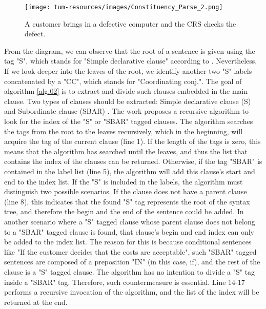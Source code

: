 \begin{figure}[h]
    \centering
    \caption{A customer brings in a defective computer and the CRS checks the defect.}
    \label{sec:implementation:constituency_parser}
    \texttt{[image: tum-resources/images/Constituency\_Parse\_2.png]}
\end{figure}

From the diagram, we can observe that the root of a sentence is given using the tag "S", which stands for "Simple declarative clause" according to \cite{penn_tree}. Nevertheless, If we look deeper into the leaves of the root, we identify another two "S" labels concatenated by a "CC", which stands for "Coordinating conj.". The goal of algorithm \ref{alg:02} is to extract and divide such clauses embedded in the main clause. Two types of clauses should be extracted: Simple declarative clause (S) and Subordinate clause (SBAR) \cite{penn_tree_explanation_2}. The work proposes a recursive algorithm to look for the index of the "S" or "SBAR" tagged clauses. The algorithm searches the tags from the root to the leaves recursively, which in the beginning, will acquire the tag of the current clause (line 1). If the length of the tags is zero, this means that the algorithm has searched until the leaves, and thus the list that contains the index of the clauses can be returned. Otherwise, if the tag "SBAR" is contained in the label list (line 5), the algorithm will add this clause's start and end to the index list. If the "S" is included in the labels, the algorithm must distinguish two possible scenarios. If the clause does not have a parent clause (line 8), this indicates that the found "S" tag represents the root of the syntax tree, and therefore the begin and the end of the sentence could be added. In another scenario where a "S" tagged clause whose parent clause does not belong to a "SBAR" tagged clause is found, that clause's begin and end index can only be added to the index list. The reason for this is because conditional sentences like "If the customer decides that the costs are acceptable", such "SBAR" tagged sentences are composed of a preposition "IN" (in this case, if), and the rest of the clause is a "S" tagged clause. The algorithm has no intention to divide a "S" tag inside a "SBAR" tag. Therefore, such countermeasure is essential. Line 14-17 performs a recursive invocation of the algorithm, and the list of the index will be returned at the end.

